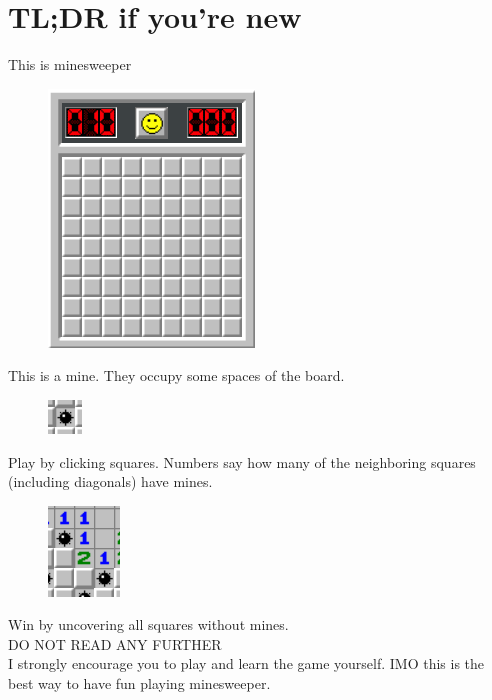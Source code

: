 \section*{TL;DR if you're new}

This is minesweeper\\
\begin{figure}[h]
    \centering
    \includegraphics{figures/1/empty_board.PNG}
\end{figure}

This is a mine. They occupy some spaces of the board.\\
\begin{figure}[h]
    \centering
    \includegraphics{figures/1/mine.PNG}
\end{figure}

Play by clicking squares. Numbers say how many of the neighboring squares (including diagonals) have mines.\\
\begin{figure}[h]
    \centering
    \includegraphics{figures/1/example.PNG}
\end{figure}

Win by uncovering all squares without mines.\\


\vspace{10em}
{\huge DO NOT READ ANY FURTHER}\\

I strongly encourage you to play and learn the game yourself. IMO this is the best way to have fun playing minesweeper.

